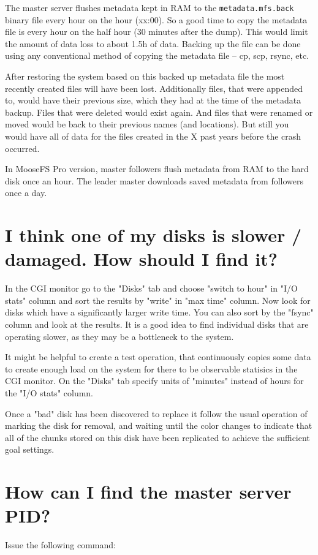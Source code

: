 \documentclass[a4paper,11pt,english]{report}
\def\code#1{\texttt{#1}}
\begin{document}
		The master server flushes metadata kept in RAM to the \code{metadata.mfs.back} binary file every hour on the hour (xx:00). So a good time to copy the metadata file is every hour on the half hour (30 minutes after the dump). This would limit the amount of data loss to about 1.5h of data. Backing up the file can be done using any conventional method of copying the metadata file -- cp, scp, rsync, etc.
		
		After restoring the system based on this backed up metadata file the most recently created files will have been lost. Additionally files, that were appended to, would have their previous size, which they had at the time of the metadata backup. Files that were deleted would exist again. And files that were renamed or moved would be back to their previous names (and locations). But still you would have all of data for the files created in the X past years before the crash occurred.
		
		In MooseFS Pro version, master followers flush metadata from RAM to the hard disk once an hour. The leader master downloads saved metadata from followers once a day.
		 
		 
		\section{I think one of my disks is slower / damaged. How should I find it?}
		In the CGI monitor go to the "Disks" tab and choose "switch to hour" in "I/O stats" column and sort the results by "write" in "max time" column. Now look for disks which have a significantly larger write time. You can also sort by the "fsync" column and look at the results. It is a good idea to find individual disks that are operating slower, as they may be a bottleneck to the system.
		
		It might be helpful to create a test operation, that continuously copies some data to create enough load on the system for there to be observable statisics in the CGI monitor. On the "Disks" tab specify units of "minutes" instead of hours for the "I/O stats" column.
		
		Once a "bad" disk has been discovered to replace it follow the usual operation of marking the disk for removal, and waiting until the color changes to indicate that all of the chunks stored on this disk have been replicated to achieve the sufficient goal settings.
		
		
		\section{How can I find the master server PID?} 
		Issue the following command:
\end{document}
